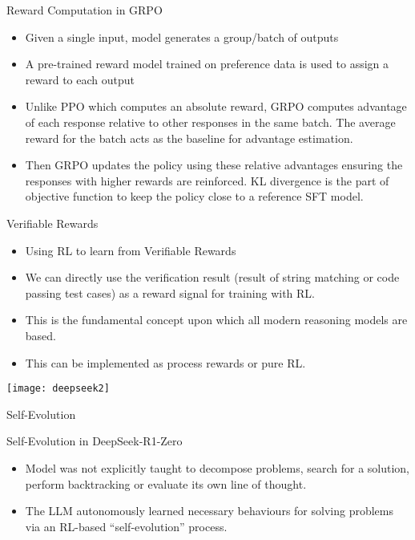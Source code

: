 \begin{frame}[fragile]{Reward Computation in GRPO}


    \begin{itemize}
        \item    Given a single input, model generates a group/batch of outputs
        \item    A pre-trained reward model trained on preference data is used to assign a 
reward to each output
        \item    Unlike PPO which computes an absolute reward, GRPO computes 
advantage of each response relative to other responses in the same batch. 
The average reward for the batch acts as the baseline for advantage estimation.
        \item     Then GRPO updates the policy using these relative advantages ensuring the 
responses with higher rewards are reinforced. KL divergence is the part of 
objective function to keep the policy close to a reference SFT model. 
    \end{itemize}
\end{frame}

\begin{frame}[fragile]{Verifiable Rewards}


    \begin{itemize}
        \item   Using RL to learn from Verifiable Rewards
        \item    We can directly use the verification result (result of string matching 
or code passing test cases) as a reward signal for training with RL. 
        \item   This is the fundamental concept upon which all modern reasoning 
models are based.
        \item    This can be implemented as process rewards or pure RL. 
    \end{itemize}

		\begin{center}
		\texttt{[image: deepseek2]}
		\end{center}

\end{frame}

\begin{frame}[fragile]{Self-Evolution}

Self-Evolution in DeepSeek-R1-Zero

    \begin{itemize}
        \item    Model was not explicitly taught to decompose problems, search for a 
solution, perform backtracking or evaluate its own line of thought. 
        \item   The LLM autonomously learned necessary behaviours for solving 
problems via an RL-based ``self-evolution'' process. 
    \end{itemize}
\end{frame}

